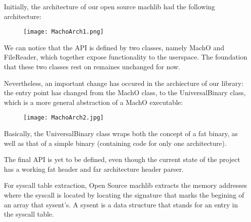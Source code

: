 
Initially, the architecture of our open source machlib had the following
architecture:

\begin{figure}[H]
  \texttt{[image: MachoArch1.png]}
  \centering
\end{figure}

We can notice that the API is defined by two classes, namely MachO and
FileReader, which together expose functionality to the userspace. The
foundation that these two classes rest on remaines unchanged for now.

Nevertheless, an important change has occured in the archiecture of our
library: the entry point has changed from the MachO class, to the
UniversalBinary class, which is a more general abstraction of a MachO
executable:

\begin{figure}[H]
  \texttt{[image: MachoArch2.jpg]}
  \centering
\end{figure}

Basically, the UniversalBinary class wraps both the concept of a fat binary,
as well as that of a simple binary (containing code for only one
architecture).

The final API is yet to be defined, even though the current state of the
project has a working fat header and far architecture header parser.

For syscall table extraction, Open Source machlib extracts the memory
addresses where the syscall is located by locating the signature that marks
the begining of an array that sysent's. A sysent is a data structure that
stands for an entry in the syscall table.
